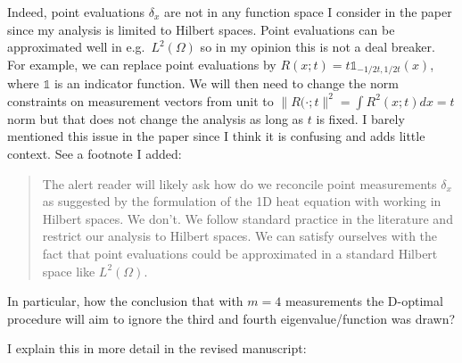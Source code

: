 \AR Indeed, point evaluations $\delta_x$ are not in any function space
I consider in the paper since my analysis is limited to Hilbert
spaces. Point evaluations can be approximated well in
e.g.~$L^2(\Omega)$ so in my opinion this is not a deal breaker. For
example, we can replace point evaluations by $R(x;t) =
t\mathbb{1}_{-1/2t, 1/2t}(x)$, where $\mathbb{1}$ is an indicator
function. We will then need to change the norm constraints on
measurement vectors from unit to $\|R(\cdot;t\|^2 = \int R^2(x;t)dx =
t$ norm but that does not change the analysis as long as $t$ is
fixed. I barely mentioned this issue in the paper since I think it is
confusing and adds little context. See a footnote I added:

\begin{quote} %
  The alert reader will likely ask how do we reconcile point
  measurements $\delta_x$ as suggested by the formulation of the 1D
  heat equation with working in Hilbert spaces. We don't. We follow
  standard practice in the literature and restrict our analysis to
  Hilbert spaces. We can satisfy ourselves with the fact that point
  evaluations could be approximated in a standard Hilbert space like
  $L^2(\Omega)$.
\end{quote}
  
\RC In particular, how the conclusion that with $m = 4$ measurements
the D-optimal procedure will aim to ignore the third and fourth
eigenvalue/function was drawn?

\AR I explain this in more detail in the revised manuscript:


